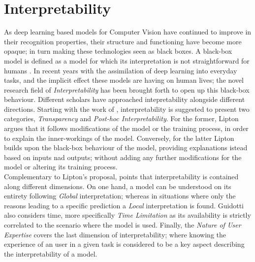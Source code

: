 \section{Interpretability}
\label{rel:sec_int}
As deep learning based models for Computer Vision have continued to improve in their recognition 
properties, their structure and functioning have become more opaque; in turn making these 
technologies seen as black boxes. A black-box model is defined as a model for which its 
interpretation is not straightforward for humans \autocite{petch2022opening}. In recent years 
with the assimilation of deep learning into everyday tasks, and the implicit effect these models 
are having on human lives; the novel research field of \emph{Interpretability} has been brought 
forth to open up this black-box behaviour. Different scholars have approached intepretability 
alongside different directions. Starting with the work of \cite{li2018deep}, interpretability is 
suggested to present two categories, \emph{Transparency} and \emph{Post-hoc Interpretability}.
For the former, Lipton argues that it follows modifications of the model or the training process, 
in order to explain the inner-workings of the model. Conversely, for the latter Lipton builds upon 
the black-box behaviour of the model, providing explanations istead based on inputs nad outputs; 
without adding any further modifications for the model or altering its training process.\\

Complementary to Lipton's proposal, \cite{guidotti2018survey} points that interpretability is 
contained along different dimensions. On one hand, a model can be understood on its entirety 
following \emph{Global} interpretation; whereas in situations where only the reasons leading to a 
specific prediction a \emph{Local} interpretation is found. Guidotti also considers time,
more specifically \emph{Time Limitation} as its availability is strictly correlated to the scenario 
where the model is used. Finally, the \emph{Nature of User Expertise} covers the last dimension of 
interpretability; where knowing the experience of an user in a given task is considered to be a 
key aspect describing the interpretability of a model.\\

